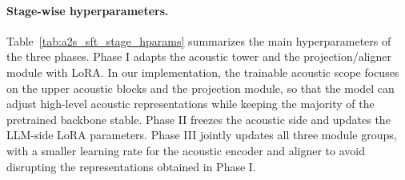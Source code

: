 \documentclass{llmxive}
\begin{document}
\paragraph{Stage-wise hyperparameters.}
Table~\ref{tab:a2s_sft_stage_hparams} summarizes the main hyperparameters of the
three phases. Phase I adapts the acoustic tower and the projection/aligner module
with LoRA. In our implementation, the trainable acoustic scope focuses on the
upper acoustic blocks and the projection module, so that the model can adjust
high-level acoustic representations while keeping the majority of the pretrained
backbone stable. Phase II freezes the acoustic side and updates the LLM-side
LoRA parameters. Phase III jointly updates all three module groups, with a smaller
learning rate for the acoustic encoder and aligner to avoid disrupting the
representations obtained in Phase I.
\end{document}
